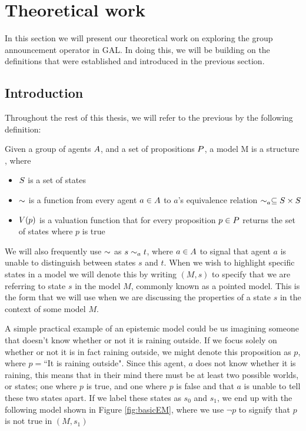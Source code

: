 \section{Theoretical work}\label{sec:theory}

In this section we will present our theoretical work on exploring the group announcement operator in GAL. In doing this, we will be building on the definitions that were established and introduced in the previous section.

\subsection{Introduction}


Throughout the rest of this thesis, we will refer to the previous by the following definition: 
\begin{definition}[Models]\label{def:model}
	Given a group of agents $A$, and a set of propositions $P$, a model M is a structure \model{} , where
	\begin{itemize}
		\item $S$ is a set of states
		\item $\sim$ is a function from every agent $a \in A$ to $a$'s equivalence relation $\sim_a \subseteq S\times S$
		\item $V(p)$ is a valuation function that for every proposition $p \in P$ returns the set of states where $p$ is true
	\end{itemize}
\end{definition}

We will also frequently use $\sim$ as $s\sim_a t$, where $a\in A$ to signal that agent $a$ is unable to distinguish between states $s$ and $t$. When we wish to highlight specific states in a model we will denote this by writing $(M,s)$ to specify that we are referring to state $s$ in the model $M$, commonly known as a pointed model. This is the form that we will use when we are discussing the properties of a state $s$ in the context of some model $M$. 

A simple practical example of an epistemic model could be us imagining someone that doesn't know whether or not it is raining outside. If we focus solely on whether or not it is in fact raining outside, we might denote this proposition as $p$, where $p = $``It is raining outside". Since this agent, $a$ does not know whether it is raining, this means that in their mind there must be at least two possible worlds, or states; one where $p$ is true, and one where $p$ is false and that $a$ is unable to tell these two states apart. If we label these states as $s_0$ and $s_1$, we end up with the following model shown in Figure \ref{fig:basicEM}, where we use $\neg p$ to signify that $p$ is not true in $(M,s_1)$

